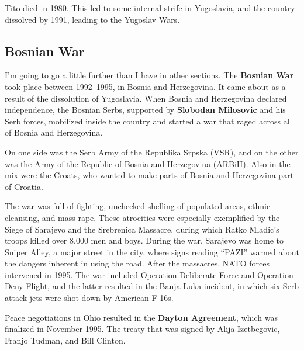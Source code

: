 Tito died in 1980.
This led to some internal strife in Yugoslavia,
and the country dissolved by 1991, leading to the Yugoslav Wars.

\subsection*{Bosnian War}

I'm going to go a little further than I have in other sections.
The \textbf{Bosnian War} took place between 1992--1995, in Bosnia and Herzegovina.
It came about as a result of the dissolution of Yugoslavia.
When Bosnia and Herzegovina declared independence,
the Bosnian Serbs, supported by \textbf{Slobodan Milosovic} and his Serb forces,
mobilized inside the country and started a war that raged across all of Bosnia and Herzegovina.

On one side was the Serb Army of the Republika Srpska (VSR),
and on the other was the Army of the Republic of Bosnia and Herzegovina (ARBiH).
Also in the mix were the Croats, who wanted to make parts of Bosnia and Herzegovina part of Croatia.

The war was full of fighting,
unchecked shelling of populated areas, ethnic cleansing, and mass rape.
These atrocities were especially exemplified by the Siege of Sarajevo
and the Srebrenica Massacre, during which Ratko Mladic's troops killed over 8,000 men and boys.
During the war, Sarajevo was home to Sniper Alley, a major street in the city,
where signs reading ``PAZI'' warned about the dangers inherent in using the road.
After the massacres, NATO forces intervened in 1995.
The war included Operation Deliberate Force and Operation Deny Flight,
and the latter resulted in the Banja Luka incident,
in which six Serb attack jets were shot down by American F-16s.

Peace negotiations in Ohio resulted in the \textbf{Dayton Agreement},
which was finalized in November 1995.
The treaty that was signed by Alija Izetbegovic, Franjo Tuđman, and Bill Clinton.

